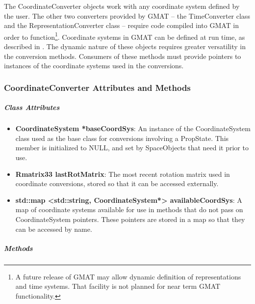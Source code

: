 The CoordinateConverter objects work with any coordinate system defined by the user.  The other two
converters provided by GMAT -- the TimeConverter class and the RepresentationConverter class --
require code compiled into GMAT in order to function\footnote{A future release of GMAT may allow
dynamic definition of representations and time systems.  That facility is not planned for near term
GMAT functionality.}.  Coordinate systems in GMAT can be defined at run time, as described in
\cite{userGuide}.  The dynamic nature of these objects requires greater versatility in the
conversion
methods.  Consumers of these methods must provide pointers to instances of the coordinate systems
used in the conversions.

\subsubsection{CoordinateConverter Attributes and Methods}

\subparagraph{\textit{Class Attributes}}

\begin{itemize}
\item \textbf{CoordinateSystem *baseCoordSys}: An instance of the CoordinateSystem class used as
the base class for conversions involving a PropState.  This member is initialized to NULL, and set
by SpaceObjects that need it prior to use.
\item \textbf{Rmatrix33 lastRotMatrix}: The most recent rotation matrix used in coordinate
conversions, stored so that it can be accessed externally.
\item \textbf{std::map <std::string, CoordinateSystem*> availableCoordSys}: A map of coordinate
systems available for use in methods that do not pass on CoordinateSystem pointers.  These pointers
are stored in a map so that they can be accessed by name.
\end{itemize}

\subparagraph{\textit{Methods}}

